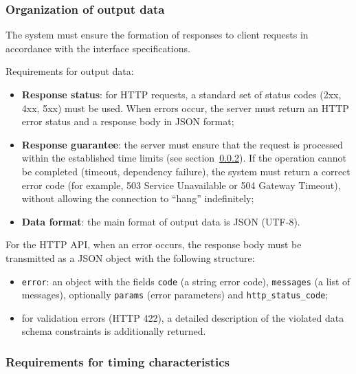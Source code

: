 \documentclass[12pt,a4paper]{extarticle}
\begin{document}
\subsubsection{Organization of output data}
\label{sec:output_data}

\begin{hseExample}
The system must ensure the formation of responses to client requests in accordance with the interface specifications.

Requirements for output data:
\begin{itemize}[nosep, leftmargin=1.25cm]
    \item \textbf{Response status}: for HTTP requests, a standard set of status codes (2xx, 4xx, 5xx) must be used. When errors occur, the server must return an HTTP error status and a response body in JSON format;
    \item \textbf{Response guarantee}: the server must ensure that the request is processed within the established time limits (see section~\ref{sec:temporal_reqs}). If the operation cannot be completed (timeout, dependency failure), the system must return a correct error code (for example, 503 Service Unavailable or 504 Gateway Timeout), without allowing the connection to \enquote{hang} indefinitely;
    \item \textbf{Data format}: the main format of output data is JSON (UTF-8).
\end{itemize}

For the HTTP API, when an error occurs, the response body must be transmitted as a JSON object with the following structure:
\begin{itemize}[nosep, leftmargin=1.25cm]
    \item \texttt{error}: an object with the fields \texttt{code} (a string error code), \texttt{messages} (a list of messages), optionally \texttt{params} (error parameters) and \texttt{http\_status\_code};
    \item for validation errors (HTTP 422), a detailed description of the violated data schema constraints is additionally returned.
\end{itemize}
\end{hseExample}

\subsubsection{Requirements for timing characteristics}
\label{sec:temporal_reqs}
\end{document}
